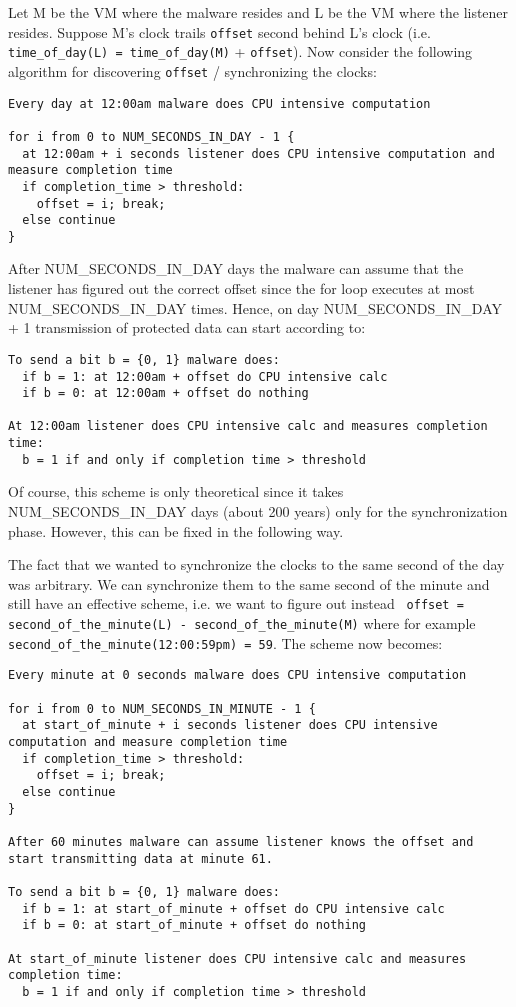 \noindent Let M be the VM where the malware resides and L be the VM where the listener resides. Suppose M's clock trails \verb+offset+ second behind L's clock (i.e. \verb+time_of_day(L) = time_of_day(M)+ + \verb+offset+). Now consider the following algorithm for discovering \verb+offset+ / synchronizing the clocks:
\begin{verbatim}
Every day at 12:00am malware does CPU intensive computation

for i from 0 to NUM_SECONDS_IN_DAY - 1 {
  at 12:00am + i seconds listener does CPU intensive computation and measure completion time
  if completion_time > threshold:
    offset = i; break;
  else continue
}
\end{verbatim}
After NUM\_SECONDS\_IN\_DAY days the malware can assume that the listener has figured out the correct offset since the for loop executes at most NUM\_SECONDS\_IN\_DAY times. Hence, on day NUM\_SECONDS\_IN\_DAY + 1 transmission of protected data can start according to:
\begin{verbatim}
To send a bit b = {0, 1} malware does:
  if b = 1: at 12:00am + offset do CPU intensive calc
  if b = 0: at 12:00am + offset do nothing
  
At 12:00am listener does CPU intensive calc and measures completion time:
  b = 1 if and only if completion time > threshold
\end{verbatim}
Of course, this scheme is only theoretical since it takes NUM\_SECONDS\_IN\_DAY days (about 200 years) only for the synchronization phase. However, this can be fixed in the following way. 

The fact that we wanted to synchronize the clocks to the same second of the day was arbitrary. We can synchronize them to the same second of the minute and still have an effective scheme, i.e. we want to figure out instead \verb+ offset =+ \verb+second_of_the_minute(L) - second_of_the_minute(M)+  where for example \verb+second_of_the_minute(12:00:59pm) = 59+. The scheme now becomes:
\begin{verbatim}
Every minute at 0 seconds malware does CPU intensive computation

for i from 0 to NUM_SECONDS_IN_MINUTE - 1 {
  at start_of_minute + i seconds listener does CPU intensive computation and measure completion time
  if completion_time > threshold:
    offset = i; break;
  else continue
}

After 60 minutes malware can assume listener knows the offset and start transmitting data at minute 61.

To send a bit b = {0, 1} malware does:
  if b = 1: at start_of_minute + offset do CPU intensive calc
  if b = 0: at start_of_minute + offset do nothing
  
At start_of_minute listener does CPU intensive calc and measures completion time:
  b = 1 if and only if completion time > threshold
\end{verbatim}

